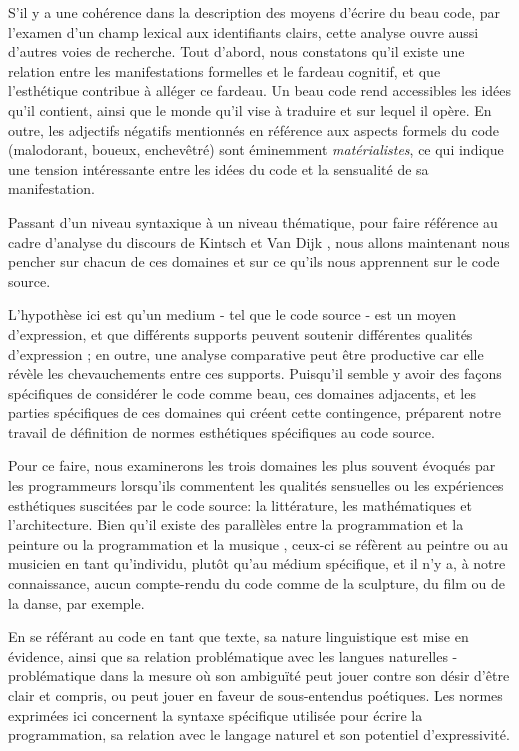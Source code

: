 \documentclass{article}
\begin{document}
S'il y a une cohérence dans la description des moyens d'écrire du beau code, par l'examen d'un champ lexical aux identifiants clairs, cette analyse ouvre aussi d'autres voies de recherche. Tout d'abord, nous constatons qu'il existe une relation entre les manifestations formelles et le fardeau cognitif, et que l'esthétique contribue à alléger ce fardeau. Un beau code rend accessibles les idées qu'il contient, ainsi que le monde qu'il vise à traduire et sur lequel il opère. En outre, les adjectifs négatifs mentionnés en référence aux aspects formels du code (malodorant, boueux, enchevêtré) sont éminemment \emph{matérialistes}, ce qui indique une tension intéressante entre les idées du code et la sensualité de sa manifestation.

Passant d'un niveau syntaxique à un niveau thématique, pour faire référence au cadre d'analyse du discours de Kintsch et Van Dijk \citep{dijk_strategies_1983b}, nous allons maintenant nous pencher sur chacun de ces domaines et sur ce qu'ils nous apprennent sur le code source.

L'hypothèse ici est qu'un medium - tel que le code source - est un moyen d'expression, et que différents supports peuvent soutenir différentes qualités d'expression ; en outre, une analyse comparative peut être productive car elle révèle les chevauchements entre ces supports. Puisqu'il semble y avoir des façons spécifiques de considérer le code comme beau, ces domaines adjacents, et les parties spécifiques de ces domaines qui créent cette contingence, préparent notre travail de définition de normes esthétiques spécifiques au code source.

Pour ce faire, nous examinerons les trois domaines les plus souvent évoqués par les programmeurs lorsqu'ils commentent les qualités sensuelles ou les expériences esthétiques suscitées par le code source: la littérature, les mathématiques et l'architecture. Bien qu'il existe des parallèles entre la programmation et la peinture \citep{graham_hackers_2003} ou la programmation et la musique \citep{mclean_hacking_2004}, ceux-ci se réfèrent au peintre ou au musicien en tant qu'individu, plutôt qu'au médium spécifique, et il n'y a, à notre connaissance, aucun compte-rendu du code comme de la sculpture, du film ou de la danse, par exemple.

En se référant au code en tant que texte, sa nature linguistique est mise en évidence, ainsi que sa relation problématique avec les langues naturelles - problématique dans la mesure où son ambiguïté peut jouer contre son désir d'être clair et compris, ou peut jouer en faveur de sous-entendus poétiques. Les normes exprimées ici concernent la syntaxe spécifique utilisée pour écrire la programmation, sa relation avec le langage naturel et son potentiel d'expressivité.
\end{document}
